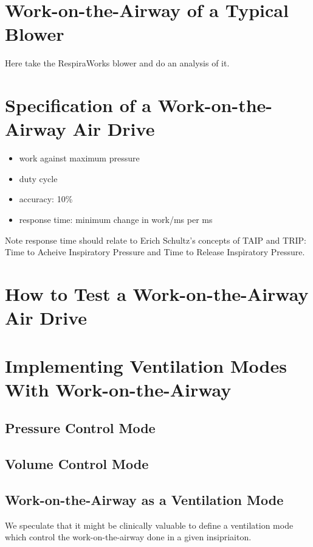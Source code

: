 \documentclass{article}
\begin{document}
\section{Work-on-the-Airway of a Typical Blower}

Here take the RespiraWorks blower and do an analysis of it.


\section{Specification of a Work-on-the-Airway Air Drive}

\begin{itemize}
\item{work against maximum pressure}
\item{duty cycle}
\item{accuracy: 10\%}
\item{response time: minimum change in work/ms per ms}
\end{itemize}

Note response time should relate to Erich Schultz's concepts of
TAIP and TRIP: Time to Acheive Inspiratory Pressure and
Time to Release Inspiratory Pressure.

\section{How to Test a  Work-on-the-Airway Air Drive}



\section{Implementing Ventilation Modes With Work-on-the-Airway}

\subsection{Pressure Control Mode}
\subsection{Volume Control Mode}


\subsection{Work-on-the-Airway as a Ventilation Mode}

We speculate that it might be clinically valuable to
define a ventilation mode which control the work-on-the-airway
done in a given insipriaiton.





\end{document}
